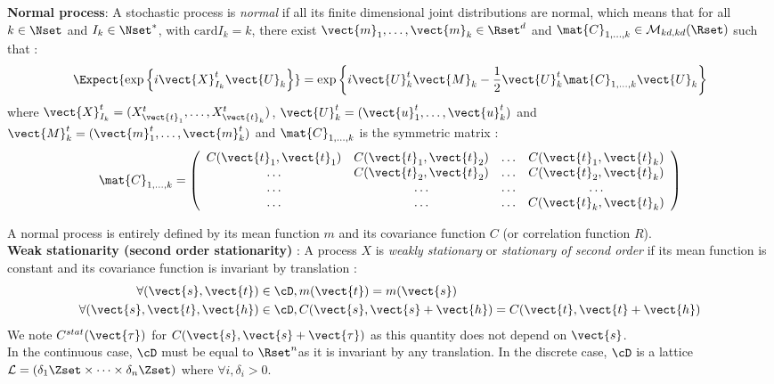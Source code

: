 {\bf Normal process}: A stochastic process is {\itshape normal}  if all its finite dimensional joint distributions are normal, which means that for all $k  \in  \Nset$ and $I_k \in \Nset^*$, with $\mathrm{card} I_k = k$, there exist $\vect{m}_1,\dots,\vect{m}_k\in\Rset^d$ and $\mat{C}_{1,\dots,k}\in\mathcal{M}_{kd,kd}(\Rset)$ such that :
\begin{align}
  \Expect{\exp\left\{i\vect{X}_{I_k}^t \vect{U}_{k}  \right\}} =
  \exp{\left\{i\vect{U}_{k}^t\vect{M}_{k}-\frac{1}{2}\vect{U}_{k}^t\mat{C}_{1,\dots,k}\vect{U}_{k}\right\}}
\end{align}
where $\vect{X}_{I_k}^t = (X_{\vect{t}_1}^t, \hdots, X_{\vect{t}_k}^t)$, $\vect{U}_{k}^t = (\vect{u}_{1}^t, \hdots, \vect{u}_{k}^t)$ and $\vect{M}_{k}^t = (\vect{m}_{1}^t, \hdots, \vect{m}_{k}^t)$   and $\mat{C}_{1,\dots,k}$ is the symmetric matrix :
\begin{align}\label{covMatrix}
  \mat{C}_{1,\dots,k} = \left(
  \begin{array}{cccc}
    C(\vect{t}_1, \vect{t}_1) &C(\vect{t}_1, \vect{t}_2) & \hdots & C(\vect{t}_1, \vect{t}_{k}) \\
    \hdots & C(\vect{t}_2, \vect{t}_2)  & \hdots & C(\vect{t}_2, \vect{t}_{k}) \\
    \hdots & \hdots & \hdots & \hdots \\
    \hdots & \hdots & \hdots & C(\vect{t}_{k}, \vect{t}_{k})
  \end{array}
  \right)
\end{align}

A normal process is entirely defined by its mean function $m$ and its  covariance function  $C$ (or  correlation function  $R$).\\


{\bf Weak stationarity (second order stationarity) }: A process $X$ is \emph{ weakly stationary} or \emph{stationary of second order} if its mean function is constant and its covariance function is invariant by  translation :
\begin{align}\label{stat2order}
  \forall  (\vect{s},\vect{t}) \in \cD, &   \, m(\vect{t})   =  m(\vect{s}) \\
  \forall (\vect{s},\vect{t},\vect{h}) \in \cD,  &  \, C(\vect{s}, \vect{s}+\vect{h})  =C(\vect{t}, \vect{t}+\vect{h})
\end{align}
We note $C^{stat}(\vect{\tau})$ for $C(\vect{s}, \vect{s}+\vect{\tau})$ as this quantity does not depend on $\vect{s}$.\\
In the continuous case, $\cD$ must be equal to $\Rset^n$as it is invariant by any translation.  In the discrete case, $\cD$ is a lattice $\mathcal{L}=(\delta_1 \Zset \times \dots \times \delta_n \Zset)$ where $\forall i, \delta_i >0$. \\


